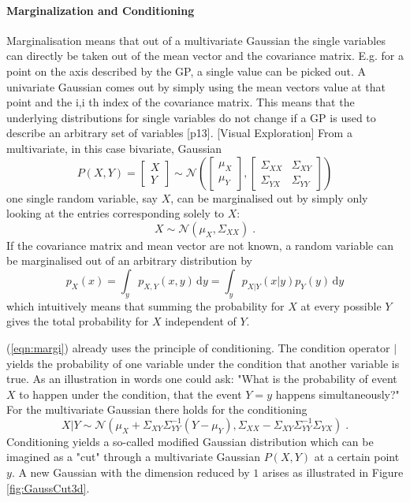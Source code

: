 \documentclass[%
  a4paper,oneside,%
  11pt,%
  smallchapters,
  style=printdev,
  extramargin,
  green,%
  rgb, <cmyk>
  ]{tubsbook}
\begin{document}
\paragraph{Marginalization and Conditioning} 
\label{sec:Marg}
Marginalisation means that out of a multivariate Gaussian the single variables can directly be taken out of the mean vector and the covariance matrix. E.g. for a point on the axis described by the GP, a single value can be picked out. A univariate Gaussian comes out by simply using the mean vectors value at that point and the i,i th index of the covariance matrix. This means that the underlying distributions for single variables do not change if a GP is used to describe an arbitrary set of variables [p13].
[Visual Exploration]
From a multivariate, in this case bivariate, Gaussian
\begin{equation}
P(X,Y) = \begin{bmatrix}
           X \\
           Y
         \end{bmatrix} \sim \mathcal{N}\left( \begin{bmatrix}
           \mu_X \\
           \mu_Y
         \end{bmatrix}, \begin{bmatrix}
\Sigma_{XX} & \Sigma_{XY} \\
\Sigma_{YX} & \Sigma_{YY} 
\end{bmatrix}  \right)
\end{equation}
one single random variable, say $X$, can be marginalised out by simply only looking at the entries corresponding solely to $X$:
\begin{equation}
X \sim \mathcal{N}(\mu_X, \Sigma_{XX}) \;.
\end{equation}
If the covariance matrix and mean vector are not known, a random variable can be marginalised out of an arbitrary distribution by
\begin{equation}
p_X(x) = \int_y p_{X,Y}(x,y)\,\mathrm{d}y = \int_y p_{X|Y}(x|y)p_Y(y)\,\mathrm{d}y
\label{eqn:margi}
\end{equation}
which intuitively means that summing the probability for $X$ at every possible $Y$ gives the total probability for $X$ independent of $Y$. 

(\ref{eqn:margi}) already uses the principle of conditioning. The condition operator $|$ yields the probability of one variable under the condition that another variable is true. As an illustration in words one could ask: "What is the probability of event $X$ to happen under the condition, that the event $Y=y$ happens simultaneously?"
For the multivariate Gaussian there holds for the conditioning
\begin{equation}
X|Y \sim \mathcal{N}(\mu_X +\Sigma_{XY} \Sigma_{YY}^{-1}(Y-\mu_Y), \Sigma_{XX} - \Sigma_{XY}\Sigma_{YY}^{-1}\Sigma_{YX} ) \;.
\end{equation}
%
Conditioning yields a so-called modified Gaussian distribution which can be imagined as a "cut" through a multivariate Gaussian $P(X,Y)$ at a certain point $y$. A new Gaussian with the dimension reduced by $1$ arises as illustrated in Figure \ref{fig:GaussCut3d}.
\end{document}
